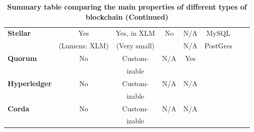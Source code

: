 \begin{table}
\begin{centering}
{\begin{tabular}{| l | c | c | c | c | c | c | c |}
\textbf{Stellar}		&Yes			&Yes, in XLM	&No
				&N/A			&MySQL		&				&\\
				&(Lumens: XLM)&(Very small)	&
				&N/A			&PostGres	&				&\\				
\hline
\textbf{Quorum} 	&No			&Custom-		&N/A
				&Yes			&			&				&\\
			 	&			&izable		&
				& 			&			&				& \\
\hline
\textbf{Hyperledger}	&No			&Custom-		&N/A
				&N/A			&			&				&\\
 				&			&izable		&
				&			&			&				& \\
\hline
\textbf{Corda} 		&No			&Custom-			&N/A
				&N/A			&			&				& \\
		 		&			&izable		&
				& 			&			&				& \\
\hline
\end{tabular}}
\caption{\bf \small Summary table comparing the main properties of different types of blockchain (Continued)}
\label{blockchain_types2}
\end{centering}
\end{table}








